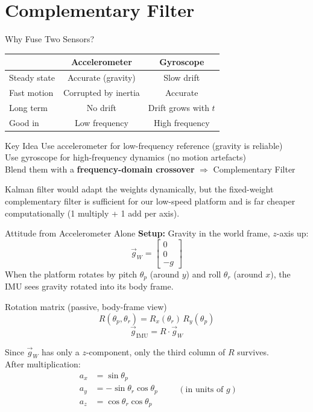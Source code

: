 \documentclass[10pt]{beamer}
\begin{document}
\section{Complementary Filter}

\begin{frame}{Why Fuse Two Sensors?}
  \begin{center}
  \footnotesize
  \begin{tabular}{lcc}
    \toprule
     & \textbf{Accelerometer} & \textbf{Gyroscope} \\
    \midrule
    Steady state & Accurate (gravity) & Slow drift \\
    Fast motion & Corrupted by inertia & Accurate \\
    Long term & No drift & Drift grows with $t$ \\
    \midrule
    Good in & Low frequency & High frequency \\
    \bottomrule
  \end{tabular}
  \end{center}

  \begin{block}{Key Idea}
    Use accelerometer for low-frequency reference (gravity is reliable)\\
    Use gyroscope for high-frequency dynamics (no motion artefacts)\\
    Blend them with a \textbf{frequency-domain crossover} $\Rightarrow$ Complementary Filter
  \end{block}

  \scriptsize
  Kalman filter would adapt the weights dynamically, but the fixed-weight complementary filter is sufficient for our low-speed platform and is far cheaper computationally (1 multiply + 1 add per axis).
\end{frame}

\begin{frame}{Attitude from Accelerometer Alone}
  \textbf{Setup:} Gravity in the world frame, $z$-axis up:
  \[
    \vec{g}_W = \begin{bmatrix} 0\\0\\-g \end{bmatrix}
  \]
  When the platform rotates by pitch $\theta_p$ (around $y$) and roll $\theta_r$ (around $x$), the IMU sees gravity rotated into its body frame.

  \begin{block}{Rotation matrix (passive, body-frame view)}
    \[
      R(\theta_p, \theta_r) = R_x(\theta_r)\, R_y(\theta_p)
    \]
    \[
      \vec{g}_{\text{IMU}} = R \cdot \vec{g}_W
    \]
  \end{block}

  Since $\vec{g}_W$ has only a $z$-component, only the third column of $R$ survives.\\
  After multiplication:
  \[
    \begin{aligned}
      a_x &= \sin\theta_p \\
      a_y &= -\sin\theta_r \cos\theta_p \\
      a_z &= \cos\theta_r \cos\theta_p
    \end{aligned}
    \qquad (\text{in units of } g)
  \]
\end{frame}
\end{document}
